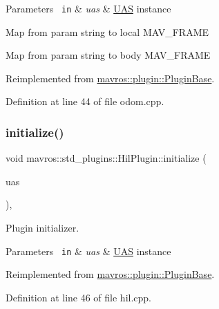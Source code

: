 \begin{DoxyParams}[1]{Parameters}
\mbox{\texttt{ in}}  & {\em uas} & {\ttfamily \mbox{\hyperlink{classmavros_1_1UAS}{U\+AS}}} instance \\
\hline
\end{DoxyParams}
Map from param string to local M\+A\+V\+\_\+\+F\+R\+A\+ME

Map from param string to body M\+A\+V\+\_\+\+F\+R\+A\+ME

Reimplemented from \mbox{\hyperlink{group__plugin_gad5313a41da4d26acbbabf008cdc21e82}{mavros\+::plugin\+::\+Plugin\+Base}}.



Definition at line 44 of file odom.\+cpp.

\mbox{\label{group__plugin_ga1c3a000c7280d16696fcb006961ae7d2}} 
\subsubsection{\texorpdfstring{initialize()}{initialize()}\hspace{0.1cm}{\footnotesize\ttfamily [27/41]}}
{\footnotesize\ttfamily void mavros\+::std\+\_\+plugins\+::\+Hil\+Plugin\+::initialize (\begin{DoxyParamCaption}\item[{\mbox{\hyperlink{classmavros_1_1UAS}{U\+AS}} \&}]{uas }\end{DoxyParamCaption})\hspace{0.3cm}{\ttfamily [inline]}, {\ttfamily [virtual]}}



Plugin initializer. 


\begin{DoxyParams}[1]{Parameters}
\mbox{\texttt{ in}}  & {\em uas} & {\ttfamily \mbox{\hyperlink{classmavros_1_1UAS}{U\+AS}}} instance \\
\hline
\end{DoxyParams}


Reimplemented from \mbox{\hyperlink{group__plugin_gad5313a41da4d26acbbabf008cdc21e82}{mavros\+::plugin\+::\+Plugin\+Base}}.



Definition at line 46 of file hil.\+cpp.

\mbox{\label{group__plugin_ga2a6372c5c89e9910eb979bc01a257609}} 

